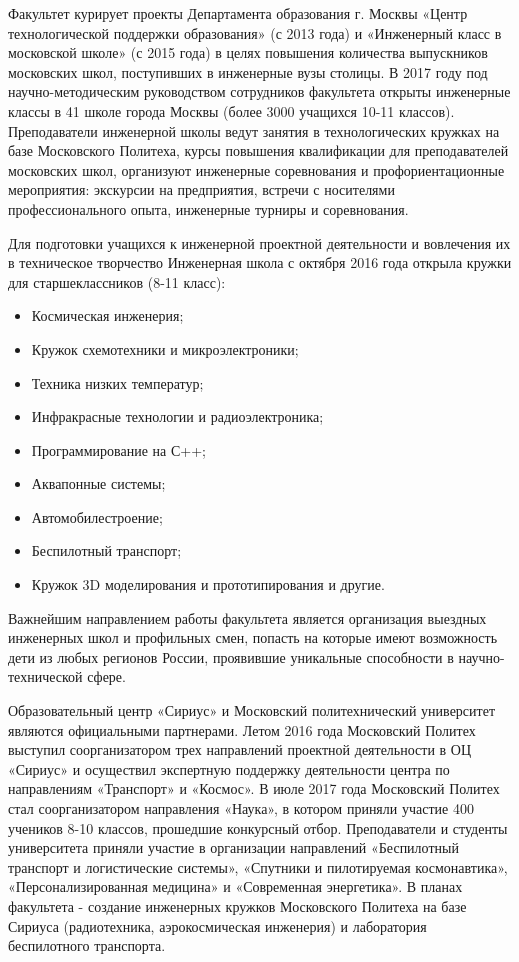 Факультет курирует проекты Департамента образования г. Москвы «Центр технологической поддержки образования» (с 2013 года) и «Инженерный класс в московской школе» (с 2015 года) в целях повышения количества выпускников московских школ, поступивших в инженерные вузы столицы. В 2017 году под научно-методическим руководством сотрудников факультета открыты инженерные классы в 41 школе города Москвы (более 3000 учащихся 10-11 классов). Преподаватели инженерной школы ведут занятия в технологических кружках на базе Московского Политеха, курсы повышения квалификации для преподавателей московских школ, организуют инженерные соревнования и профориентационные мероприятия: экскурсии на предприятия, встречи с носителями профессионального опыта, инженерные турниры и соревнования.

Для подготовки учащихся к инженерной проектной деятельности и вовлечения их в техническое творчество Инженерная школа с октября 2016 года открыла кружки для старшеклассников (8-11 класс):
\begin{itemize}
    \item Космическая инженерия;
    \item Кружок схемотехники и микроэлектроники;
    \item Техника низких температур;
    \item Инфракрасные технологии и радиоэлектроника;
    \item Программирование на С++;
    \item Аквапонные системы;
    \item Автомобилестроение;
    \item Беспилотный транспорт;
    \item Кружок 3D моделирования и прототипирования и другие.
\end{itemize}

Важнейшим направлением работы факультета является организация выездных инженерных школ и профильных смен, попасть на которые имеют возможность дети из любых регионов России, проявившие уникальные способности в научно-технической сфере.

Образовательный центр «Сириус» и Московский политехнический университет являются официальными партнерами. Летом 2016 года Московский Политех выступил соорганизатором трех направлений проектной деятельности в ОЦ «Сириус» и осуществил экспертную поддержку деятельности центра по направлениям «Транспорт» и «Космос». В июле 2017 года Московский Политех стал соорганизатором направления «Наука», в котором приняли участие 400 учеников 8-10 классов, прошедшие конкурсный отбор. Преподаватели и студенты университета приняли участие в организации направлений «Беспилотный транспорт и логистические системы», «Спутники и пилотируемая космонавтика», «Персонализированная медицина» и «Современная энергетика». В планах факультета - создание инженерных кружков Московского Политеха на базе Сириуса (радиотехника, аэрокосмическая инженерия) и лаборатория беспилотного транспорта.

